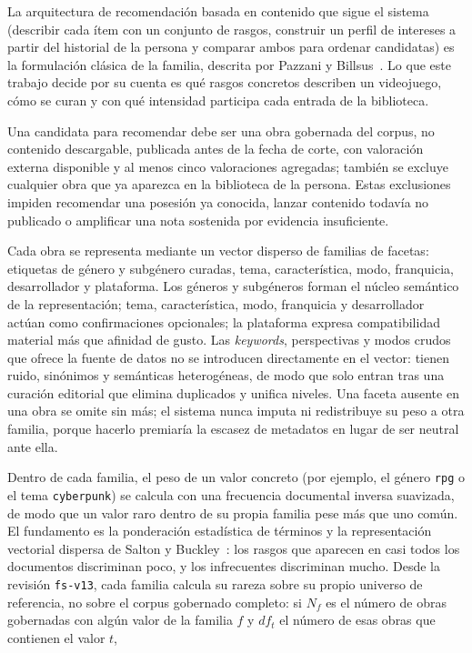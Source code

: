 La arquitectura de recomendación basada en contenido que sigue el sistema (describir cada ítem
con un conjunto de rasgos, construir un perfil de intereses a partir del historial de la
persona y comparar ambos para ordenar candidatas) es la formulación clásica de la familia,
descrita por Pazzani y Billsus~\cite{pazzani2007content}. Lo que este trabajo decide por su
cuenta es qué rasgos concretos describen un videojuego, cómo se curan y con qué intensidad
participa cada entrada de la biblioteca.

Una candidata para recomendar debe ser una obra gobernada del corpus, no contenido
descargable, publicada antes de la fecha de corte, con valoración externa disponible y al
menos cinco valoraciones agregadas; también se excluye cualquier obra que ya aparezca en la
biblioteca de la persona. Estas exclusiones impiden recomendar una posesión ya conocida,
lanzar contenido todavía no publicado o amplificar una nota sostenida por evidencia
insuficiente.

Cada obra se representa mediante un vector disperso de familias de facetas: etiquetas de
género y subgénero curadas, tema, característica, modo, franquicia, desarrollador y
plataforma. Los géneros y subgéneros forman el núcleo semántico de la representación; tema,
característica, modo, franquicia y desarrollador actúan como confirmaciones opcionales; la
plataforma expresa compatibilidad material más que afinidad de gusto. Las \emph{keywords},
perspectivas y modos crudos que ofrece la fuente de datos no se introducen directamente en el
vector: tienen ruido, sinónimos y semánticas heterogéneas, de modo que solo entran tras una
curación editorial que elimina duplicados y unifica niveles. Una faceta ausente en una obra se
omite sin más; el sistema nunca imputa ni redistribuye su peso a otra familia, porque hacerlo
premiaría la escasez de metadatos en lugar de ser neutral ante ella.

Dentro de cada familia, el peso de un valor concreto (por ejemplo, el género \texttt{rpg} o el
tema \texttt{cyberpunk}) se calcula con una frecuencia documental inversa suavizada, de modo
que un valor raro dentro de su propia familia pese más que uno común. El fundamento es la
ponderación estadística de términos y la representación vectorial dispersa de Salton y
Buckley~\cite{salton1988term}: los rasgos que aparecen en casi todos los documentos
discriminan poco, y los infrecuentes discriminan mucho. Desde la revisión \texttt{fs-v13}, cada
familia calcula su rareza sobre su propio universo de referencia, no sobre el corpus gobernado
completo: si \(N_f\) es el número de obras gobernadas con algún valor de la familia \(f\) y
\(df_t\) el número de esas obras que contienen el valor \(t\),

